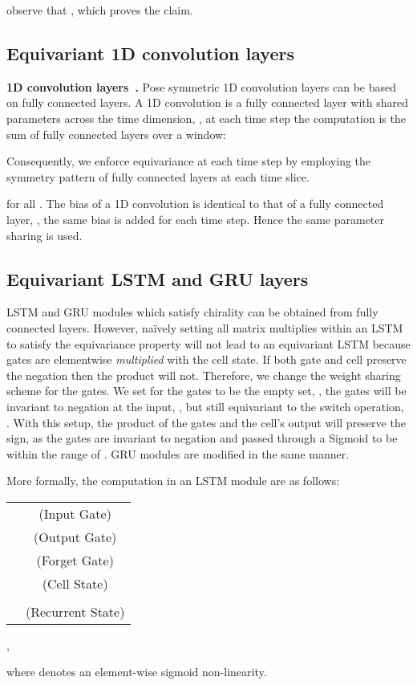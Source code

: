 \documentclass{article}
\begin{document}
observe that , which proves the claim. \hfill 

 
\subsection{Equivariant 1D convolution layers}
{
\textbf{1D convolution layers~\cite{waibel1995phoneme, lecun1999object}.}
}
Pose symmetric 1D convolution layers can be based on fully connected layers. A 1D convolution is a fully connected layer with shared parameters across the time dimension, \ie, at each time step the computation is the sum of fully connected layers over a window:
 
Consequently, we  enforce equivariance at each time step by employing the  symmetry pattern of fully connected layers at each time slice. 

for all . 
The bias of a 1D convolution is identical to that of a fully connected layer, \ie, the  same bias is added for each time step. Hence the same parameter sharing is used. 



\subsection{Equivariant LSTM and GRU layers}
LSTM and GRU modules which satisfy chirality can be obtained from fully connected layers.  
However, na\"ively setting all matrix multiplies within an LSTM to satisfy the equivariance property will not lead to an equivariant LSTM because gates are elementwise \textit{multiplied} with the cell state. If both  gate and cell  preserve the negation then the product will not. Therefore, we  change the weight sharing scheme for the gates. We set  for the gates to be the empty set, \ie,  the gates will be invariant to negation at the input, , but still equivariant to the switch operation, . With this setup, the product of the gates and the cell's output will preserve the sign, as the gates are invariant to negation and passed through a Sigmoid to be within the range of .  GRU modules are modified  in the same manner. 

More formally, the computation in an LSTM module are as follows:
\begin{center}
\begin{tabular}{lc}
  & (Input Gate)\\
  & (Output  Gate)\\
  & (Forget Gate) \\
  &  (Cell State) \\
  & \\
  & (Recurrent State)\\
\end{tabular},
\end{center}
where  denotes an element-wise sigmoid non-linearity.
\end{document}
